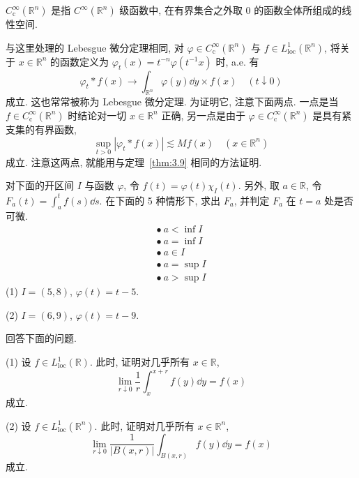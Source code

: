 $C_{\mathrm{c}}^{\infty}(\mathbb{R}^{n})$ 是指 $C^{\infty}(\mathbb{R}^{n})$ 级函数中, 在有界集合之外取 $0$ 的函数全体所组成的线性空间.

\begin{note}\label{note:3.2}
与这里处理的 Lebesgue 微分定理相同, 对 $\varphi \in C_{\mathrm{c}}^{\infty}(\mathbb{R}^{n})$ 与 $f \in L_{\mathrm{loc}}^{1}(\mathbb{R}^{n})$, 将关于 $x \in \mathbb{R}^{n}$ 的函数定义为 $\varphi_{t}(x) = t^{-n}\varphi(t^{-1}x)$ 时, a.e. 有
\[
\varphi_{t} * f(x) \to \int_{\mathbb{R}^{n}}\varphi(y)\dd y \times f(x) \quad (t \downarrow 0)
\]
成立. 这也常常被称为 Lebesgue 微分定理. 为证明它, 注意下面两点. 一点是当 $f \in C_{\mathrm{c}}^{\infty}(\mathbb{R}^{n})$ 时结论对一切 $x \in \mathbb{R}^{n}$ 正确, 另一点是由于 $\varphi \in C_{\mathrm{c}}^{\infty}(\mathbb{R}^{n})$ 是具有紧支集的有界函数,
\[
\sup_{t > 0}|\varphi_{t} * f(x)| \lesssim Mf(x) \quad (x \in \mathbb{R}^{n})
\]
成立. 注意这两点, 就能用与定理~\ref{thm:3.9} 相同的方法证明.
\end{note}

\begin{exercise}\label{exer:3.7}
对下面的开区间 $I$ 与函数 $\varphi$, 令 $f(t) = \varphi(t)\chi_{I}(t)$. 另外, 取 $a \in \mathbb{R}$, 令 $F_{a}(t) = \int_{a}^{t}f(s)\dd s$. 在下面的 5 种情形下, 求出 $F_{a}$, 并判定 $F_{a}$ 在 $t = a$ 处是否可微.
\[
\begin{array}{l}
\bullet\ a < \inf I \\
\bullet\ a = \inf I \\
\bullet\ a \in I \\
\bullet\ a = \sup I \\
\bullet\ a > \sup I
\end{array}
\]
(1) $I = (5, 8)$, $\varphi(t) = t - 5$.

(2) $I = (6, 9)$, $\varphi(t) = t - 9$.
\end{exercise}

\begin{exercise}\label{exer:3.8}
回答下面的问题.

(1) 设 $f \in L_{\mathrm{loc}}^{1}(\mathbb{R})$. 此时, 证明对几乎所有 $x \in \mathbb{R}$,
\begin{equation}\tag{3.16}
\lim_{r \downarrow 0}\frac{1}{r}\int_{x}^{x+r}f(y)\dd y = f(x)
\label{eq:3.16}
\end{equation}
成立.

(2) 设 $f \in L_{\mathrm{loc}}^{1}(\mathbb{R}^{n})$. 此时, 证明对几乎所有 $x \in \mathbb{R}^{n}$,
\begin{equation}\tag{3.17}
\lim_{r \downarrow 0}\frac{1}{|B(x,r)|}\int_{B(x,r)}f(y)\dd y = f(x)
\label{eq:3.17}
\end{equation}
成立.
\end{exercise}

